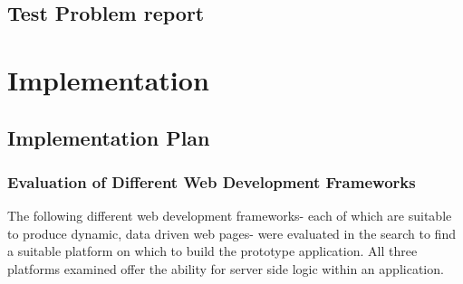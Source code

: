 \documentclass[a4paper,12pt]{article}
\begin{document}
\subsection {Test Problem report}
\section {Implementation}
\subsection {Implementation Plan}

\subsubsection{Evaluation of Different Web Development Frameworks}
The following different web development frameworks- each of which are suitable to produce dynamic, data driven web pages- were evaluated in the search to find a suitable platform on which to build the prototype application. All three platforms examined offer the ability for server side logic within an application.
\end{document}
